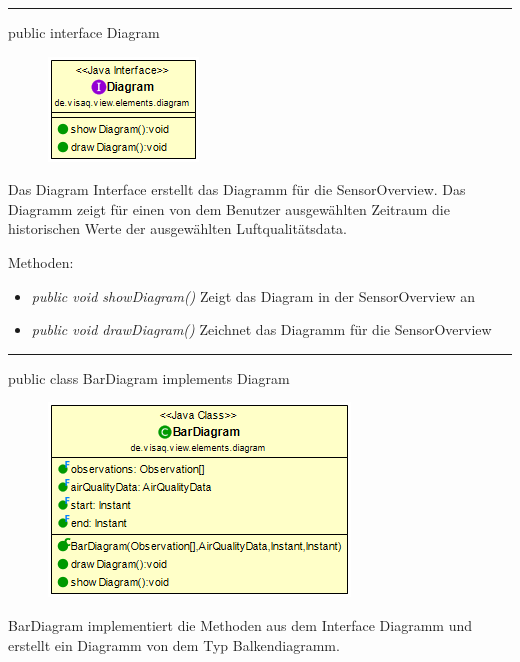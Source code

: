 

\rule{\textwidth}{0.4pt} 
public interface Diagram

\begin{minipage}{0.3\textwidth}
    \begin{figure}[H]
        \includegraphics[scale = 0.7]{media/frontend/view/de.view.elements.diagram/Diagram_Class.png}
    \end{figure}
\end{minipage} \hfill
\begin{minipage}{0.6\textwidth}
Das Diagram Interface erstellt das Diagramm für die SensorOverview. Das Diagramm zeigt für einen von dem Benutzer ausgewählten Zeitraum die historischen Werte der ausgewählten Luftqualitätsdata.
\end{minipage}

Methoden:
\begin{itemize} 
    \item \emph{public void showDiagram()} Zeigt das Diagram in der SensorOverview an
    \item \emph{public void drawDiagram()} Zeichnet das Diagramm für die SensorOverview
\end{itemize}

\rule{\textwidth}{0.4pt} 
public class BarDiagram implements Diagram

\begin{minipage}{0.3\textwidth}
    \begin{figure}[H]
        \includegraphics[scale = 0.5]{media/frontend/view/de.view.elements.diagram/BarDiagram_Class.png}
    \end{figure}
    \end{minipage} \hfill
    \begin{minipage}{0.6\textwidth}
BarDiagram implementiert die Methoden aus dem Interface Diagramm und erstellt ein Diagramm von dem Typ Balkendiagramm.
\end{minipage}


